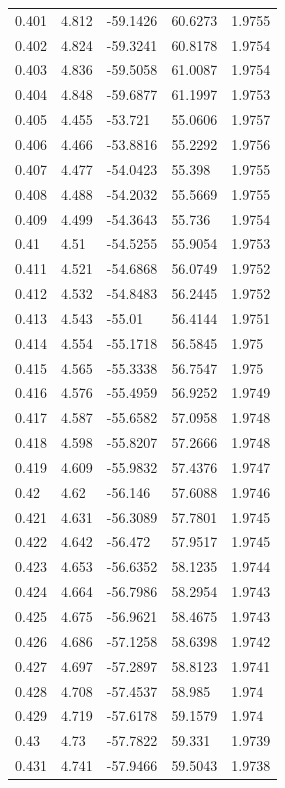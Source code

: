 \begin{tabular}{lllll}
0.401 & 4.812 & -59.1426 & 60.6273 & 1.9755 \\
0.402 & 4.824 & -59.3241 & 60.8178 & 1.9754 \\
0.403 & 4.836 & -59.5058 & 61.0087 & 1.9754 \\
0.404 & 4.848 & -59.6877 & 61.1997 & 1.9753 \\
0.405 & 4.455 & -53.721 & 55.0606 & 1.9757 \\
0.406 & 4.466 & -53.8816 & 55.2292 & 1.9756 \\
0.407 & 4.477 & -54.0423 & 55.398 & 1.9755 \\
0.408 & 4.488 & -54.2032 & 55.5669 & 1.9755 \\
0.409 & 4.499 & -54.3643 & 55.736 & 1.9754 \\
0.41 & 4.51 & -54.5255 & 55.9054 & 1.9753 \\
0.411 & 4.521 & -54.6868 & 56.0749 & 1.9752 \\
0.412 & 4.532 & -54.8483 & 56.2445 & 1.9752 \\
0.413 & 4.543 & -55.01 & 56.4144 & 1.9751 \\
0.414 & 4.554 & -55.1718 & 56.5845 & 1.975 \\
0.415 & 4.565 & -55.3338 & 56.7547 & 1.975 \\
0.416 & 4.576 & -55.4959 & 56.9252 & 1.9749 \\
0.417 & 4.587 & -55.6582 & 57.0958 & 1.9748 \\
0.418 & 4.598 & -55.8207 & 57.2666 & 1.9748 \\
0.419 & 4.609 & -55.9832 & 57.4376 & 1.9747 \\
0.42 & 4.62 & -56.146 & 57.6088 & 1.9746 \\
0.421 & 4.631 & -56.3089 & 57.7801 & 1.9745 \\
0.422 & 4.642 & -56.472 & 57.9517 & 1.9745 \\
0.423 & 4.653 & -56.6352 & 58.1235 & 1.9744 \\
0.424 & 4.664 & -56.7986 & 58.2954 & 1.9743 \\
0.425 & 4.675 & -56.9621 & 58.4675 & 1.9743 \\
0.426 & 4.686 & -57.1258 & 58.6398 & 1.9742 \\
0.427 & 4.697 & -57.2897 & 58.8123 & 1.9741 \\
0.428 & 4.708 & -57.4537 & 58.985 & 1.974 \\
0.429 & 4.719 & -57.6178 & 59.1579 & 1.974 \\
0.43 & 4.73 & -57.7822 & 59.331 & 1.9739 \\
0.431 & 4.741 & -57.9466 & 59.5043 & 1.9738 \\

\end{tabular}
